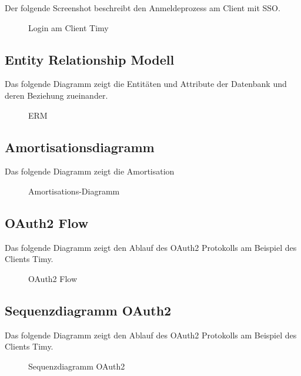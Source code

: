 Der folgende Screenshot beschreibt  den Anmeldeprozess am Client mit \acs{SSO}.
\begin{figure}[htb]
\centering
{}
\caption{Login am Client Timy}
\end{figure}
\clearpage

\subsection{Entity Relationship Modell}
\label{app:ERM}
Das folgende Diagramm zeigt die Entitäten und Attribute der Datenbank und deren Beziehung zueinander.
\begin{figure}[htb]
\centering
{}
\caption{ERM}
\end{figure}
\clearpage

\subsection{Amortisationsdiagramm}
\label{app:Amortisationsdiagramm}
Das folgende Diagramm zeigt die Amortisation
\begin{figure}[htb]
\centering
{}
\caption{Amortisations-Diagramm}
\end{figure}
\clearpage

\subsection{OAuth2 Flow}
\label{app:oauth2flow}
Das folgende Diagramm zeigt den Ablauf des OAuth2 Protokolls am Beispiel des Clients Timy.
\begin{figure}[htb]
\centering
{}
\caption{OAuth2 Flow}
\end{figure}
\clearpage

\subsection{Sequenzdiagramm OAuth2}
\label{app:sequenzdiagramm}
Das folgende Diagramm zeigt den Ablauf des OAuth2 Protokolls am Beispiel des Clients Timy.
\begin{figure}[htb]
\centering
{}
\caption{Sequenzdiagramm OAuth2}
\end{figure}
\clearpage



